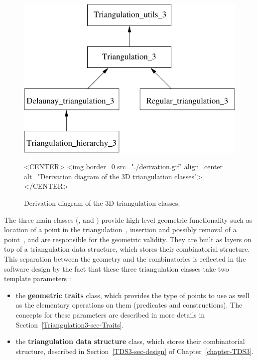 \begin{figure}[htbp]
\begin{ccTexOnly}
\begin{center} 
\includegraphics{Triangulation_3/derivation} 
\end{center}
\end{ccTexOnly}
\caption{Derivation diagram of the 3D triangulation classes.
\label{t3_derivation}}
\begin{ccHtmlOnly}
<CENTER>
<img border=0 src="./derivation.gif" align=center
 alt="Derivation diagram of the 3D triangulation classes"> 
</CENTER>
\end{ccHtmlOnly}
\end{figure} 

The three main classes (, 
and ) provide high-level geometric functionality
such as location of a point in the triangulation~\cite{cgal:dpt-wt-02}, insertion
and possibly removal of a point~\cite{cgal:dt-pvr3d-03}, and are responsible for the
geometric validity.  They are built as layers on top of a triangulation data
structure, which stores their combinatorial structure.  This separation between
the geometry and the combinatorics is reflected in the software design by the
fact that these three triangulation classes take two template parameters :

\begin{itemize}
\item {} the \textbf{geometric traits} class, which provides the type of points
to use as well as the elementary operations on them (predicates and
constructions).  The concepts for these parameters are described in more
details in Section~\ref{Triangulation3-sec-Traits}.
\item {} the \textbf{triangulation data structure} class, which stores their
combinatorial structure, described in Section~\ref{TDS3-sec-design} of
Chapter~\ref{chapter-TDS3}.
\end{itemize}

